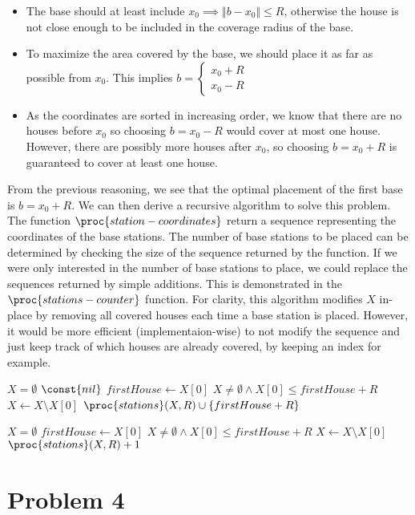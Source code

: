 \documentclass[a4paper, 10pt, twoside]{article}
\begin{document}
\begin{itemize}
	\item The base should at least include $x_0 \implies \Vert b - x_0 \Vert \leq R$, otherwise the house is not close enough to be included in the coverage radius of the base.
	\item To maximize the area covered by the base, we should place it as far as possible from $x_0$. This implies $b = \begin{cases} x_0 + R \\ x_0 - R \end{cases}$
	\item As the coordinates are sorted in increasing order, we know that there are no houses before $x_0$ so choosing $b = x_0 -R $ would cover at most one house. However, there are possibly more houses after $x_0$, so choosing $b = x_0 + R$ is guaranteed to cover at least one house.
\end{itemize}

From the previous reasoning, we see that the optimal placement of the first base is $b = x_0 + R$.  We can then derive a recursive algorithm to solve this problem. The function $\proc{station-coordinates}$ return a sequence representing the coordinates of the base stations. The number of base stations to be placed can be determined by checking the size of the sequence returned by the function. If we were only interested in the number of base stations to place, we could replace the sequences returned by simple additions. This is demonstrated in the $\proc{stations-counter}$ function. 
For clarity, this algorithm modifies $X$ in-place by removing all covered houses each time a base station is placed. However, it would be more efficient (implementaion-wise) to not modify the sequence and just keep track of which houses are already covered, by keeping an index for example.

\begin{codebox}
	\zi \If $X = \emptyset$
	\zi \Then \Return $\const{nil}$ \End
	\zi $firstHouse \gets X[0]$
	\zi \While $X \neq \emptyset \land X[0]  \leq firstHouse + R$
	\zi \Then $X \gets X \setminus X[0]$ \End
	\zi \Return $\proc{stations}(X, R) \cup \{ firstHouse + R \}$ \End
\end{codebox}

\begin{codebox}
	\zi \If $X = \emptyset$
	\zi \Then {} \End
	\zi $firstHouse \gets X[0]$
	\zi \While $X \neq \emptyset \land X[0]  \leq firstHouse + R$
	\zi \Then $X \gets X \setminus X[0]$ \End
	\zi \Return $\proc{stations}(X, R) + 1$ \End
\end{codebox}

\section*{Problem 4}
\end{document}

